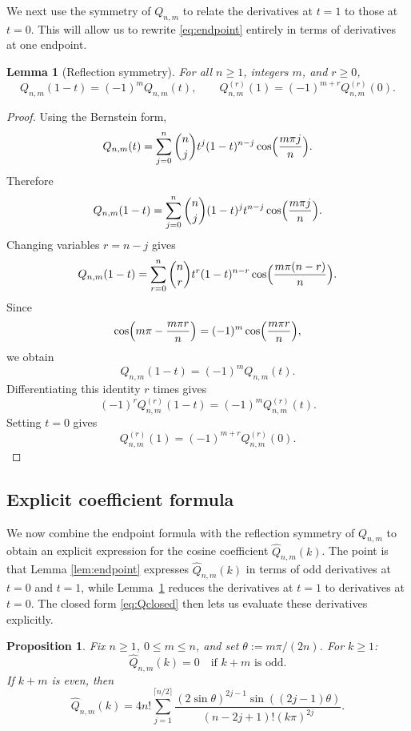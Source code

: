 \documentclass[10pt,a4paper]{amsart}
\newtheorem{lemma}[theorem]{Lemma}
\newtheorem{proposition}[theorem]{Proposition}
\begin{document}
We next use the symmetry of $Q_{n,m}$ to relate the derivatives at $t=1$ to those at $t=0$. This will allow us to rewrite \eqref{eq:endpoint} entirely in terms of derivatives at one endpoint.

\begin{lemma}[Reflection symmetry]\label{lem:reflect}
For all $n\ge1$, integers $m$, and $r\ge0$,
\[
Q_{n,m}(1-t)=(-1)^mQ_{n,m}(t),
\qquad
Q_{n,m}^{(r)}(1)=(-1)^{m+r}Q_{n,m}^{(r)}(0).
\]
\end{lemma}


\begin{proof}
Using the Bernstein form,
\[ 
Q_{n,m}(t) = \sum_{j=0}^n {n\choose j}t^j(1-t)^{n-j} \cos\Bigl(\frac{m\pi j}{n}\Bigr). 
\]
Therefore
\[ 
Q_{n,m}(1-t) = \sum_{j=0}^n {n\choose j}(1-t)^jt^{n-j} \cos\Bigl(\frac{m\pi j}{n}\Bigr). 
\]
Changing variables $r=n-j$ gives
\[ 
Q_{n,m}(1-t) = \sum_{r=0}^n {n\choose r}t^r(1-t)^{n-r} \cos\Bigl(\frac{m\pi(n-r)}{n}\Bigr). 
\]
Since 
\[ 
\cos\Bigl(m\pi-\frac{m\pi r}{n}\Bigr) = (-1)^m\cos\Bigl(\frac{m\pi r}{n}\Bigr), 
\]
we obtain
\[ 
Q_{n,m}(1-t)=(-1)^mQ_{n,m}(t). 
\]
Differentiating this identity $r$ times gives
\[ 
(-1)^r Q_{n,m}^{(r)}(1-t) = (-1)^mQ_{n,m}^{(r)}(t). 
\]
Setting $t=0$ gives 
\[ 
Q_{n,m}^{(r)}(1)=(-1)^{m+r} Q_{n,m}^{(r)}(0). 
\]
\end{proof}

\subsection{Explicit coefficient formula}


We now combine the endpoint formula with the reflection symmetry of $Q_{n,m}$ to obtain an explicit expression for the cosine coefficient $\widehat Q_{n,m}(k)$. The point is that Lemma \ref{lem:endpoint} expresses $\widehat Q_{n,m}(k)$ in terms of odd derivatives at $t=0$ and $t=1$, while Lemma~\ref{lem:reflect} reduces the derivatives at $t=1$ to derivatives at $t=0$. The closed form \eqref{eq:Qclosed} then lets us evaluate these derivatives explicitly.


\begin{proposition}\label{prop:explicit}
Fix $n\ge1$, $0\le m\le n$, and set $\theta:=m\pi/(2n)$.
For $k\ge1$:
\[
\widehat Q_{n,m}(k)=0\quad\text{if }k+m\text{ is odd}.
\]
If $k+m$ is even, then
\begin{equation}\label{eq:explicit}
\widehat Q_{n,m}(k)
=4n!\sum_{j=1}^{\lceil n/2\rceil}
\frac{(2\sin\theta)^{2j-1}\sin((2j-1)\theta)}
{(n-2j+1)!(k\pi)^{2j}}.
\end{equation}
\end{proposition}
\end{document}
